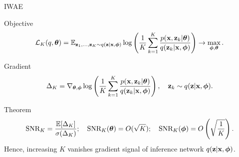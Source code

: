 \begin{frame}{IWAE}
	\begin{block}{Objective}
		\vspace{-0.5cm}
		\[
		\mathcal{L}_K (q, \boldsymbol{\theta})  = \mathbb{E}_{\mathbf{z}_1, \dots, \mathbf{z}_K \sim q(\mathbf{z} | \mathbf{x}, \boldsymbol{\phi})} \log \left( \frac{1}{K}\sum_{k=1}^K\frac{p(\mathbf{x}, \mathbf{z}_k | \boldsymbol{\theta})}{q(\mathbf{z}_k| \mathbf{x}, \boldsymbol{\phi})} \right) \rightarrow \max_{\boldsymbol{\phi}, \boldsymbol{\theta}}.
		\]
		\vspace{-0.3cm}
	\end{block}
	\begin{block}{Gradient}
		\vspace{-0.3cm}
		\[
		\Delta_K = \nabla_{\boldsymbol{\theta}, \boldsymbol{\phi}} \log \left( \frac{1}{K}\sum_{k=1}^K\frac{p(\mathbf{x}, \mathbf{z}_k | \boldsymbol{\theta})}{q(\mathbf{z}_k| \mathbf{x}, \boldsymbol{\phi})} \right), \quad \mathbf{z}_k \sim q(\mathbf{z} | \mathbf{x}, \boldsymbol{\phi}).
		\]
		\vspace{-0.3cm}
	\end{block}
	\begin{block}{Theorem}
		\vspace{-0.4cm}
		\[
			\text{SNR}_K = \frac{\mathbb{E} [\Delta_K]}{\sigma(\Delta_K)}; \quad
			\text{SNR}_K(\boldsymbol{\theta}) = O(\sqrt{K}); \quad 
			\text{SNR}_K(\boldsymbol{\phi}) = O\left(\sqrt{\frac{1}{K}}\right).
		\]
		Hence, increasing $K$ vanishes gradient signal of inference network $q(\mathbf{z} | \mathbf{x}, \boldsymbol{\phi})$.
	\end{block}

\end{frame}
